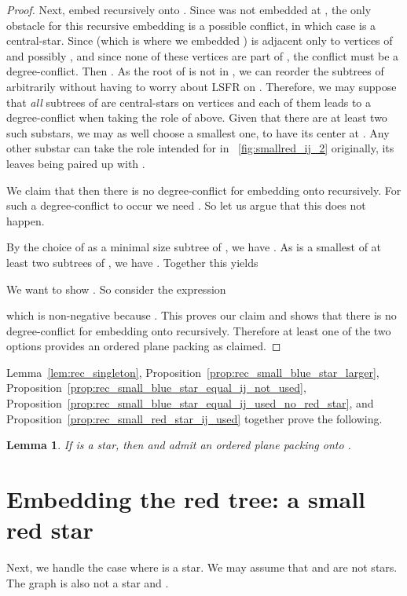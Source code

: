 \documentclass[11pt,a4paper,colorlinks=true,urlcolor=blue,citecolor=red]{article}
\theoremstyle{plain}
\newtheorem{lemma}[theorem]{Lemma}
\begin{document}
\begin{proof}
  Next, embed  recursively onto . Since  was not
  embedded at , the only obstacle for this recursive embedding is a
  possible conflict, in which case  is a
  central-star. Since  (which is where we embedded ) is
  adjacent only to vertices of  and possibly , and since none of
  these vertices are part of , the conflict must be a
  degree-conflict. Then . As the root  of  is not in
  , we can reorder the subtrees of 
  arbitrarily without having to worry about LSFR on .
  Therefore, we may suppose that \emph{all} subtrees of  are
  central-stars on  vertices and each of them leads to a
  degree-conflict when taking the role of  above. Given
  that there are at least two such substars, we may as well choose a
  smallest one,  to have its center at . Any other substar can
  take the role intended for  in
  \figurename~\ref{fig:smallred_ij_2} originally, its leaves being
  paired up with .

  We claim that then there is no degree-conflict for embedding 
  onto  recursively. For such a degree-conflict to occur
  we need . So let us argue that this
  does not happen.

  By the choice of  as a minimal size subtree of , we have
  . As  is a smallest of at least two
  subtrees of , we have . Together this
  yields
  
  We want to show . So consider the
  expression
  
  which is non-negative because . This proves our
  claim and shows that there is no degree-conflict for embedding 
  onto  recursively. Therefore at least one of the two
  options provides an ordered plane packing as claimed.
\end{proof}

Lemma~\ref{lem:rec_singleton},
Proposition~\ref{prop:rec_small_blue_star_larger},
Proposition~\ref{prop:rec_small_blue_star_equal_ij_not_used},
Proposition~\ref{prop:rec_small_blue_star_equal_ij_used_no_red_star},
and Proposition~\ref{prop:rec_small_red_star_ij_used} together prove the
following.

\begin{lemma}
  \label{lem:rec_small_blue_star}
  If  is a star, then  and  admit an ordered plane
  packing onto .
\end{lemma}

\section{Embedding the red tree: a small red star}
\label{subsec:small_red_star}
Next, we handle the case where  is a star. We may assume that
 and  are not stars. The graph  is also
not a star and .
\end{document}
